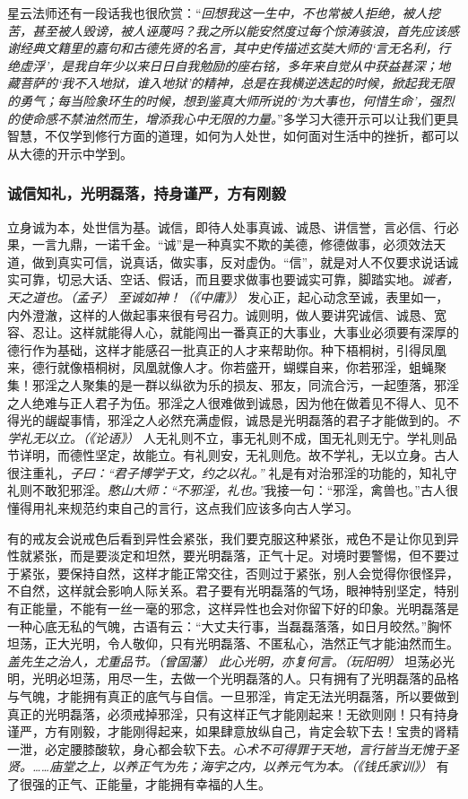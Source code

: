星云法师还有一段话我也很欣赏：“\textit{回想我这一生中，不也常被人拒绝，被人挖苦，甚至被人毁谤，被人诬蔑吗？我之所以能安然度过每个惊涛骇浪，首先应该感谢经典文籍里的嘉句和古德先贤的名言，其中史传描述玄奘大师的‘言无名利，行绝虚浮’，是我自年少以来日日自我勉励的座右铭，多年来自觉从中获益甚深；地藏菩萨的‘我不入地狱，谁入地狱’的精神，总是在我横逆迭起的时候，掀起我无限的勇气；每当险象环生的时候，想到鉴真大师所说的‘为大事也，何惜生命’，强烈的使命感不禁油然而生，增添我心中无限的力量。}”多学习大德开示可以让我们更具智慧，不仅学到修行方面的道理，如何为人处世，如何面对生活中的挫折，都可以从大德的开示中学到。

\subsubsection{诚信知礼，光明磊落，持身谨严，方有刚毅}

立身诚为本，处世信为基。诚信，即待人处事真诚、诚恳、讲信誉，言必信、行必果，一言九鼎，一诺千金。“诚”是一种真实不欺的美德，修德做事，必须效法天道，做到真实可信，说真话，做实事，反对虚伪。“信”，就是对人不仅要求说话诚实可靠，切忌大话、空话、假话，而且要求做事也要诚实可靠，脚踏实地。\textit{诚者，天之道也。（孟子）} \textit{至诚如神！（《中庸》）} 发心正，起心动念至诚，表里如一，内外澄澈，这样的人做起事来很有号召力。诚则明，做人要讲究诚信、诚恳、宽容、忍让。这样就能得人心，就能闯出一番真正的大事业，大事业必须要有深厚的德行作为基础，这样才能感召一批真正的人才来帮助你。种下梧桐树，引得凤凰来，德行就像梧桐树，凤凰就像人才。你若盛开，蝴蝶自来，你若邪淫，蛆蝇聚集！邪淫之人聚集的是一群以纵欲为乐的损友、邪友，同流合污，一起堕落，邪淫之人绝难与正人君子为伍。邪淫之人很难做到诚恳，因为他在做着见不得人、见不得光的龌龊事情，邪淫之人必然充满虚假，诚恳是光明磊落的君子才能做到的。\textit{不学礼无以立。（《论语》）} 人无礼则不立，事无礼则不成，国无礼则无宁。学礼则品节详明，而德性坚定，故能立。有礼则安，无礼则危。故不学礼，无以立身。古人很注重礼，\textit{子曰：“君子博学于文，约之以礼。”} 礼是有对治邪淫的功能的，知礼守礼则不敢犯邪淫。\textit{憨山大师：“不邪淫，礼也。”}我接一句：“邪淫，禽兽也。”古人很懂得用礼来规范约束自己的言行，这点我们应该多向古人学习。

有的戒友会说戒色后看到异性会紧张，我们要克服这种紧张，戒色不是让你见到异性就紧张，而是要淡定和坦然，要光明磊落，正气十足。对境时要警惕，但不要过于紧张，要保持自然，这样才能正常交往，否则过于紧张，别人会觉得你很怪异，不自然，这样就会影响人际关系。君子要有光明磊落的气场，眼神特别坚定，特别有正能量，不能有一丝一毫的邪念，这样异性也会对你留下好的印象。光明磊落是一种心底无私的气魄，古语有云：“大丈夫行事，当磊磊落落，如日月皎然。”胸怀坦荡，正大光明，令人敬仰，只有光明磊落、不匿私心，浩然正气才能油然而生。\textit{盖先生之治人，尤重品节。（曾国藩）} \textit{此心光明，亦复何言。（玩阳明）} 坦荡必光明，光明必坦荡，用尽一生，去做一个光明磊落的人。只有拥有了光明磊落的品格与气魄，才能拥有真正的底气与自信。一旦邪淫，肯定无法光明磊落，所以要做到真正的光明磊落，必须戒掉邪淫，只有这样正气才能刚起来！无欲则刚！只有持身谨严，方有刚毅，才能刚得起来，如果肆意放纵自己，肯定会软下去！宝贵的肾精一泄，必定腰膝酸软，身心都会软下去。\textit{心术不可得罪于天地，言行皆当无愧于圣贤。……庙堂之上，以养正气为先；海宇之内，以养元气为本。（《钱氏家训》）} 有了很强的正气、正能量，才能拥有幸福的人生。

